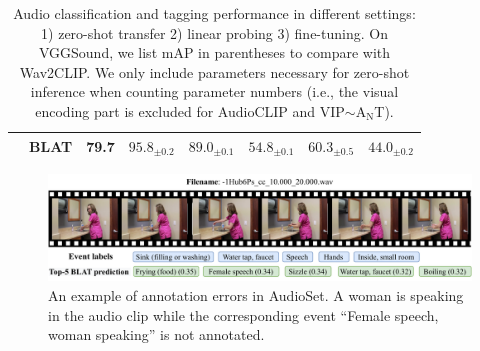 \documentclass[sigconf]{acmart}
\begin{document}
\begin{table}[ht]
\begin{tabular}{cc|c||ccccc}
     & BLAT & 79.7 & $\mathbf{95.8_{\pm 0.2}}$ & $\mathbf{89.0_{\pm 0.1}}$ & $54.8_{\pm 0.1}$ & $\mathbf{60.3_{\pm 0.5}}$ & $\mathbf{44.0_{\pm 0.2}}$\\
    \bottomrule
    \end{tabular}
    \caption{Audio classification and tagging performance in different settings: 1) zero-shot transfer 2) linear probing 3) fine-tuning. On VGGSound, we list mAP in parentheses to compare with Wav2CLIP.
    We only include parameters necessary for zero-shot inference when counting parameter numbers (i.e., the visual encoding part is excluded for AudioCLIP and VIP$\sim$A$_\text{N}$T).}
    \label{tab:classify_performance}
\end{table}

\begin{figure}[ht]
    \centering
    \includegraphics[width=0.9\linewidth]{figs/AudioSet_femalespeech_6frame.pdf}
    \caption{An example of annotation errors in AudioSet. A woman is speaking in the audio clip while the corresponding event ``Female speech, woman speaking'' is not annotated.}
    \label{fig:audioset_missing_label}
\end{figure}
\end{document}
